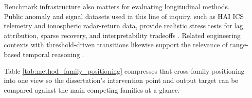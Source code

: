 Benchmark infrastructure also matters for evaluating longitudinal methods. Public anomaly and signal datasets used in this line of inquiry, such as HAI ICS telemetry and ionospheric radar-return data, provide realistic stress tests for lag attribution, sparse recovery, and interpretability tradeoffs \autocites{shin2020,sigillito1989}. Related engineering contexts with threshold-driven transitions likewise support the relevance of range-based temporal reasoning \autocite{inoue2021}.





Table \ref{tab:method_family_positioning} compresses that cross-family positioning into one view so the dissertation's intervention point and output target can be compared against the main competing families at a glance.

